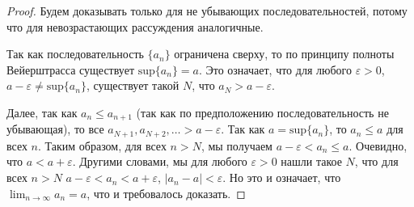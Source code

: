 \begin{proof}
    Будем доказывать только для не убывающих последовательностей, потому что для невозрастающих рассуждения аналогичные.

    Так как последовательность $\{a_n\}$ ограничена сверху, то по принципу полноты Вейерштрасса существует $\mathrm{sup}\{a_n\} = a$. Это означает, что для любого $\varepsilon >0$, $a-\varepsilon \ne \mathrm{sup}\{a_n\}$, \ie существует такой $N$, что $a_N >a -\varepsilon$.

    Далее, так как $a_n \le a_{n+1}$ (так как по предположению последовательность не убывающая), то все $a_{N+1}, a_{N+2}, \ldots > a -\varepsilon$. Так как $a = \mathrm{sup}\{a_n\}$, то $a_n \le a$ для всех $n$. Таким образом, для всех $n > N$, мы получаем $a- \varepsilon < a_n \le a$. Очевидно, что $a < a+\varepsilon$. Другими словами, мы для любого $\varepsilon >0$ нашли такое $N$, что для всех $n>N$ $a -\varepsilon < a_n < a + \varepsilon$, \ie $|a_n - a| < \varepsilon$. Но это и означает, что $\lim_{n \to \infty}a_n = a$, что и требовалось доказать.
\end{proof}


